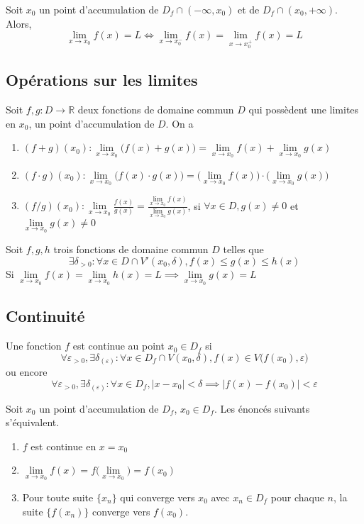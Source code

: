 		\begin{mythm}
			Soit $x_0$ un point d'accumulation de $D_f\cap(-\infty,x_0)$ et de $D_f\cap (x_0,+\infty)$. Alors, 
			\[\lim_{x\to x_0}f(x)=L\Longleftrightarrow \lim_{x\to x_0^-}f(x)=\lim_{x\to x_0^+}f(x)=L\]
		\end{mythm}
	\subsection{Opérations sur les limites}
		\begin{mythm}
			Soit $f,g:D\longrightarrow\mathbb{R}$ deux fonctions de domaine commun $D$ qui possèdent une limites en $x_0$, un point d'accumulation de $D$. On a
			\begin{enumerate}
				\item $(f+g)(x_0) : \lim\limits_{x\to x_0}\big(f(x)+g(x)\big)=\lim\limits_{x\to x_0}f(x)+\lim\limits_{x\to x_0}g(x)$
				\item $(f\cdot g)(x_0) : \lim\limits_{x\to x_0}\big(f(x)\cdot g(x)\big)=\Big(\lim\limits_{x\to x_0}f(x)\Big)\cdot\Big(\lim\limits_{x\to x_0}g(x)\Big)$
				\item $(f/g)(x_0) : \lim\limits_{x\to x_0}\frac{f(x)}{g(x)}=\frac{\lim\limits_{x\to x_0}f(x)}{\lim\limits_{x\to x_0}g(x)}$, si $\forall x\in D, g(x)\neq 0$ et $\lim\limits_{x\to x_0}g(x)\neq 0$
			\end{enumerate}
		\end{mythm}
			\begin{mythm}
				Soit $f,g,h$ trois fonctions de domaine commun $D$ telles que \[\exists\delta_{>0}: \forall x \in D\cap V'(x_0,\delta), f(x)\leq g(x)\leq h(x)\]
				Si $\lim\limits_{x\to x_0} f(x)=\lim\limits_{x\to x_0}h(x)=L \implies \lim\limits_{x\to x_0}g(x)=L$
			\end{mythm}
		\subsection{Continuité}
			\begin{mydef}
				Une fonction $f$ est continue au point $x_0\in D_f$ si \[\forall\varepsilon_{>0},\exists\delta_{(\varepsilon)} : \forall x \in D_f \cap V(x_0,\delta), f(x)\in V\big(f(x_0),\varepsilon\big)\]
				ou encore
				\[\forall\varepsilon_{>0},\exists\delta_{(\varepsilon)} :\forall x\in D_f, |x-x_0|<\delta \implies |f(x)-f(x_0)|<\varepsilon\]
			\end{mydef}
			\begin{mythm}
				Soit $x_0$ un point d'accumulation de $D_f$, $x_0\in D_f$. Les énoncés suivants s'équivalent.
				\begin{enumerate}[label =\alph*)]
					\item $f$ est continue en $x=x_0$
					\item $\lim\limits_{x\to x_0} f(x)=f\big(\lim\limits_{x\to x_0}\big)=f(x_0)$
					\item Pour toute suite $\{x_n\}$ qui converge vers $x_0$ avec $x_n\in D_f$ pour chaque $n$, la suite $\{f(x_n)\}$ converge vers $f(x_0)$.
				\end{enumerate}
			\end{mythm}
